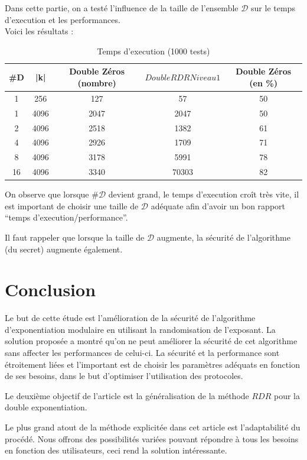 \documentclass[12pt, a4paper]{memoir}
\begin{document}
Dans cette partie, on a testé l'influence de la taille de l'ensemble $\mathcal{D}$ sur le temps d'execution et les performances. \\
Voici les résultats :
\begin{table}[htbp]
\caption{Temps d'execution (1000 tests) }
\begin{center}
\begin{tabular}{ccccc}
\toprule
\#D & |k| & Double Zéros (nombre) & $DoubleRDR Niveau 1$ & Double Zéros (en \%) \\
\midrule
1 & 256 & 127 & 57 & 50 \\
1 & 4096 & 2047 & 2047 & 50 \\
2 & 4096 & 2518 & 1382 & 61 \\
4 & 4096 & 2926 & 1709 & 71 \\
8 & 4096 & 3178 & 5991 & 78 \\
16 & 4096 & 3340 & 70303 & 82 \\
\bottomrule
\end{tabular}
\end{center}
\label{tab:example}
\end{table}%

On observe que lorsque $\#\mathcal{D}$ devient grand, le temps d'execution croît très vite, il est important 
de choisir une taille de $\mathcal{D}$ adéquate afin d'avoir un bon rapport ``temps d'execution/performance''.

Il faut rappeler que lorsque la taille de $\mathcal{D}$ augmente, la sécurité de l'algorithme (du secret) augmente également.
\chapter{Conclusion}

Le but de cette étude est l'amélioration de la sécurité de l'algorithme d'exponentiation modulaire en utilisant la randomisation de l'exposant.
La solution proposée a montré qu'on ne peut améliorer la sécurité de cet algorithme sans affecter les performances
de celui-ci. La sécurité et la performance sont étroitement liées et l'important est de choisir les paramètres 
adéquats en fonction de ses besoins, dans le but d'optimiser l'utilisation des protocoles.

Le deuxième objectif de l'article est la généralisation de la méthode $RDR$ pour la double exponentiation.


Le plus grand atout de la méthode explicitée dans cet article est l'adaptabilité du procédé. Nous offrons 
des possibilités variées pouvant répondre à tous les besoins en fonction des utilisateurs, ceci rend la 
solution intéressante.
\end{document}
